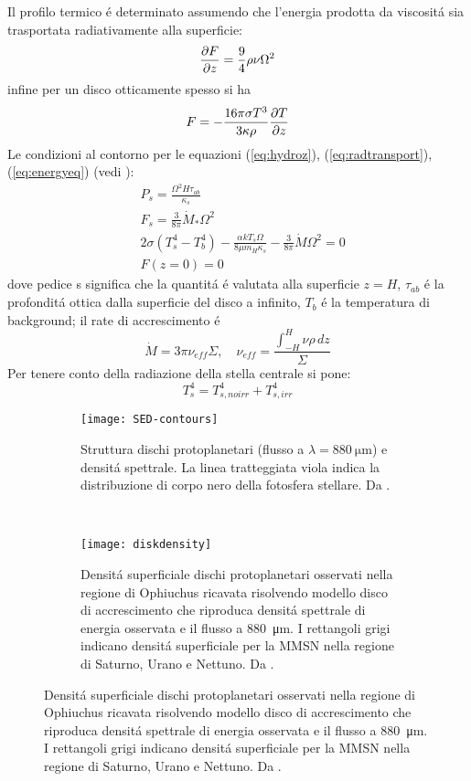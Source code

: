 Il profilo termico \'e determinato assumendo che l'energia prodotta da viscosit\'a sia trasportata radiativamente alla superficie:
\begin{equation}
\PDy{z}{F}=\frac{9}{4}\rho\nu\Omega^2\label{eq:energyeq}
\end{equation}
infine per un disco otticamente spesso si ha
\begin{equation}
F=-\frac{16\pi\sigma T^3}{3\kappa\rho}\PDy{z}{T}\label{eq:radtransport}
\end{equation}
Le condizioni al contorno per le equazioni (\ref{eq:hydroz}), (\ref{eq:radtransport}), (\ref{eq:energyeq}) (vedi \cite{benz2014planet}):
\begin{align}
&P_s=\frac{\Omega^2H\tau_{ab}}{\kappa_s}\\
&F_s=\frac{3}{8\pi}\dot{M}_*\Omega^2\\
&2\sigma(T_s^4-T_b^4)-\frac{\alpha kT_s\Omega}{8\mu m_H\kappa_s}-\frac{3}{8\pi}\dot{M}\Omega^2=0\\
&F(z=0)=0
\end{align}
dove pedice s significa che la quantit\'a \'e valutata alla superficie $z=H$, $\tau_{ab}$ \'e la profondit\'a ottica dalla superficie del disco a infinito, $T_b$ \'e la temperatura di background; il rate di accrescimento \'e
\begin{equation}
\dot{M}=3\pi\nu_{eff}\Sigma,	\quad\nu_{eff}=\frac{\int_{-H}^H\nu\rho\,dz}{\Sigma}
\end{equation}
Per tenere conto della radiazione della stella centrale si pone:
\begin{equation}
T_s^4=T_{s,noirr}^4+T_{s,irr}^4
\end{equation}

\begin{figure}[!ht]
	\begin{subfigure}[b]{0.39\textwidth}
		\centering
		\texttt{[image: SED-contours]}
		\caption{Struttura dischi protoplanetari (flusso a $\lambda=\SI{880}{\micro\meter}$) e densit\'a spettrale. La linea tratteggiata viola indica la distribuzione di corpo nero della fotosfera stellare. Da \cite{andrews2010protoplanetary}.}\label{fig:SED-contours}
	\end{subfigure}
	~
	\begin{subfigure}[b]{0.55\textwidth}
		\texttt{[image: diskdensity]}
		\caption{Densit\'a superficiale dischi protoplanetari osservati nella regione di Ophiuchus ricavata risolvendo modello disco di accrescimento che riproduca densit\'a spettrale di energia osservata e il flusso a \SI{880}{\micro\meter}. I rettangoli grigi indicano densit\'a superficiale per la MMSN nella regione di Saturno, Urano e Nettuno. Da \cite{andrews2010protoplanetary}.}\label{fig:diskdensity}
	\end{subfigure}
\end{figure}

